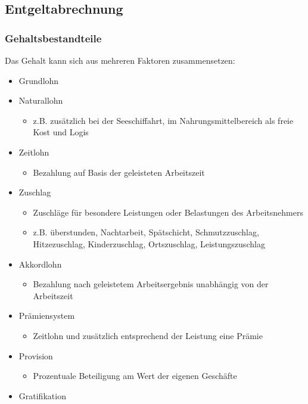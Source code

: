 \subsection{Entgeltabrechnung}

\subsubsection{Gehaltsbestandteile} 
Das Gehalt kann sich aus mehreren Faktoren zusammensetzen:
\begin{itemize}
	\item Grundlohn
	\item Naturallohn
		\begin{itemize}
			\item z.B. zusätzlich bei der Seeschiffahrt, im Nahrungsmittelbereich als \ql freie Kost und Logis\qr\
		\end{itemize}
	\item Zeitlohn
		\begin{itemize}
			\item Bezahlung auf Basis der geleisteten Arbeitszeit
		\end{itemize}
	\item Zuschlag
		\begin{itemize}
			\item Zuschläge für besondere Leistungen oder Belastungen des Arbeitsnehmers
			\item z.B. überstunden, Nachtarbeit, Spätschicht, Schmutzzuschlag, Hitzezuschlag, Kinderzuschlag, Ortszuschlag, Leistungszuschlag
		\end{itemize}
	\item Akkordlohn
		\begin{itemize}
			\item Bezahlung nach geleistetem Arbeitsergebnis unabhängig von der Arbeitszeit
		\end{itemize}
	\item Prämiensystem
		\begin{itemize}
			\item Zeitlohn und zusätzlich entsprechend der Leistung eine Prämie
		\end{itemize}
	\item Provision
		\begin{itemize}
			 \item Prozentuale Beteiligung am Wert der eigenen Geschäfte
		\end{itemize}
	\item Gratifikation
		\begin{itemize}

\end{itemize}
\end{itemize}
